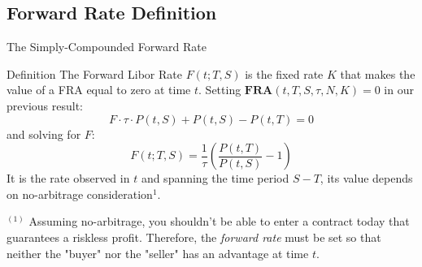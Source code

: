 \documentclass{beamer}
\begin{document}

\subsection{Forward Rate Definition}

\begin{frame}{The Simply-Compounded Forward Rate}
	\begin{block}{Definition}
		The \textcolor{maincolor}{Forward Libor Rate} $F(t; T, S)$ is the fixed rate $K$ that makes the value of a FRA equal to zero at time $t$.
		Setting $\textbf{FRA}(t, T, S, \tau, N, K) = 0$ in our previous result:
		\begin{equation*}
			F\cdot\tau\cdot P(t, S) + P(t, S) - P(t, T) = 0
		\end{equation*}
		and solving for $F$:
		\begin{equation}
			\boxed{F(t; T, S) = \frac{1}{\tau} \left( \frac{P(t, T)}{P(t, S)} - 1 \right)}
			\label{eq:forward_rate_definition}
		\end{equation}
		It is the rate observed in $t$ and spanning the time period $S-T$, its value depends on no-arbitrage consideration$^1$.
	\end{block}

	\begin{tcolorbox}[colback=gray!5, colframe=maincolor, arc=0mm, boxrule=0.5pt]
	\footnotesize
	$^{(1)}$ Assuming no-arbitrage, you shouldn't be able to enter a contract today that guarantees a riskless profit. Therefore, the \emph{forward rate} must be set so that neither the "buyer" nor the "seller" has an advantage at time $t$.
	\end{tcolorbox}
\end{frame}
\end{document}
